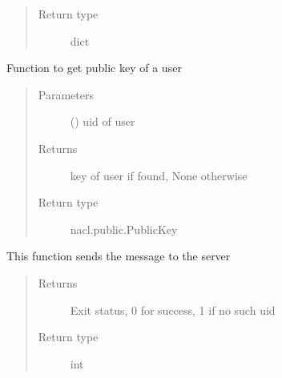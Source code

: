 \documentclass[letterpaper,10pt,english]{sphinxmanual}
\begin{document}
\begin{fulllineitems}
\begin{fulllineitems}
\begin{quote}
\begin{description}
\item[{Return type}] \leavevmode
dict

\end{description}\end{quote}

\end{fulllineitems}


\begin{fulllineitems}
\label{\detokenize{Message:Message.Message._get_user_public_key}}
Function to get public key of a user
\begin{quote}\begin{description}
\item[{Parameters}] \leavevmode
{} () \textendash{} uid of user

\item[{Returns}] \leavevmode
key of user if found, None otherwise

\item[{Return type}] \leavevmode
nacl.public.PublicKey

\end{description}\end{quote}

\end{fulllineitems}


\begin{fulllineitems}
\label{\detokenize{Message:Message.Message._sendmsg}}
This function sends the message to the server
\begin{quote}\begin{description}
\item[{Returns}] \leavevmode
Exit status, 0 for success, 1 if no such uid

\item[{Return type}] \leavevmode
int

\end{description}\end{quote}


\end{fulllineitems}
\end{fulllineitems}
\end{document}

